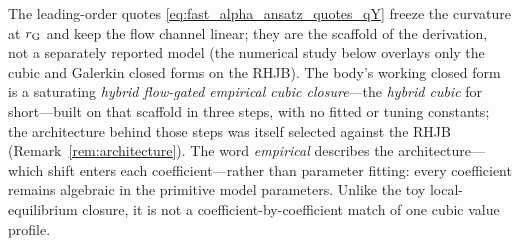 \documentclass[11pt,a4paper]{article}
\theoremstyle{plain}
\theoremstyle{definition}
\begin{document}
The leading-order quotes \eqref{eq:fast_alpha_ansatz_quotes_qY} freeze the
curvature at \(r_{\rm G}\) and keep the flow channel linear; they are the
scaffold of the derivation, not a separately reported model (the numerical
study below overlays only the cubic and Galerkin closed forms on the RHJB).
The body's working closed form is a saturating \emph{hybrid flow-gated
empirical cubic closure}---the \emph{hybrid cubic} for short---built on that
scaffold in three steps, with no fitted
or tuning constants; the architecture behind those steps was itself selected
against the RHJB (Remark~\ref{rem:architecture}).  The word \emph{empirical} describes the
architecture---which shift enters each coefficient---rather than parameter
fitting: every coefficient remains algebraic in the primitive model
parameters.  Unlike the toy local-equilibrium closure, it is not a
coefficient-by-coefficient match of one cubic value profile.
\end{document}
